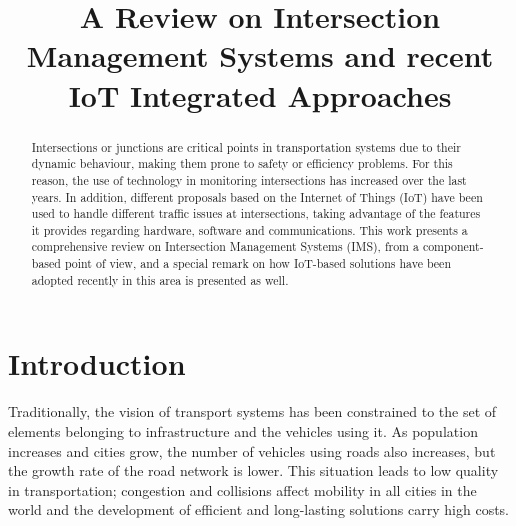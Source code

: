 \documentclass[conference]{IEEEtran}
\begin{document}
\title{A Review on Intersection Management Systems and recent IoT Integrated Approaches
}

\author{
\and
{}
}

\maketitle

\begin{abstract}
Intersections or junctions are critical points in transportation systems due to their dynamic behaviour, making them prone to safety or efficiency problems. For this reason, the use of technology in monitoring intersections has increased over the last years. In addition, different proposals based on the Internet of Things (IoT) have been used to handle different traffic issues at intersections, taking advantage of the features it provides regarding hardware, software and communications. This work presents a comprehensive review on Intersection Management Systems (IMS), from a component-based point of view, and a special remark on how IoT-based solutions have been adopted recently in this area is presented as well.
\end{abstract}

\IEEEpeerreviewmaketitle


\section{Introduction}
Traditionally, the vision of transport systems has been constrained to the set of elements belonging to infrastructure and the vehicles using it. As population increases and cities grow, the number of vehicles using roads also increases, but the growth rate of the road network is lower. This situation leads to low quality in transportation; congestion and collisions affect mobility in all cities in the world and the development of efficient and long-lasting solutions carry high costs.
\end{document}
